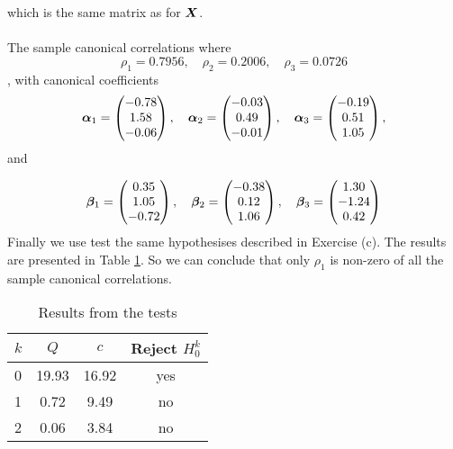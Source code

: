 which is the same matrix as for $\bm{X}$.\\
\\
The sample canonical correlations where 
\begin{equation*}
  \rho_{1} = 0.7956,\quad  \rho_{2} =   0.2006,\quad \rho_{3} =  0.0726
\end{equation*},
with canonical coefficients
\begin{equation*}
  \bm{\alpha}_{1} =
  \begin{pmatrix}
    -0.78 \\ 
    1.58 \\ 
    -0.06 
  \end{pmatrix}, \quad
  \bm{\alpha}_{2} =
  \begin{pmatrix}
    -0.03 \\ 
    0.49 \\ 
    -0.01
  \end{pmatrix}, \quad
  \bm{\alpha}_{3} =
  \begin{pmatrix}
    -0.19 \\ 
    0.51 \\ 
    1.05  
  \end{pmatrix},
\end{equation*}
and

\begin{equation*}
  \bm{\beta}_{1} =
  \begin{pmatrix}
    0.35 \\ 
    1.05 \\ 
    -0.72  
  \end{pmatrix}, \quad
  \bm{\beta}_{2} =
  \begin{pmatrix}
    -0.38 \\ 
    0.12 \\ 
    1.06  
  \end{pmatrix}, \quad
  \bm{\beta}_{3} =
  \begin{pmatrix}
    1.30 \\ 
    -1.24 \\ 
    0.42  
  \end{pmatrix}
\end{equation*}
Finally we use test the same hypothesises described in Exercise
(c). The results are presented in Table
\ref{tab:test_ex11_standardized}. So we can conclude that only
$\rho_{1}$ is non-zero of all the sample canonical correlations. 
\begin{table}
  \centering
  \begin{tabular}{l|ccc}
    $k$&$Q$&$c$& Reject $H_{0}^{k}$ \\ \hline
    0 &19.93 &16.92 & yes \\ 
    1 &0.72 &9.49 & no \\ 
    2 &0.06 &3.84 & no  
  \end{tabular}
  \caption{Results from the tests}
  \label{tab:test_ex11_standardized}
\end{table} 
